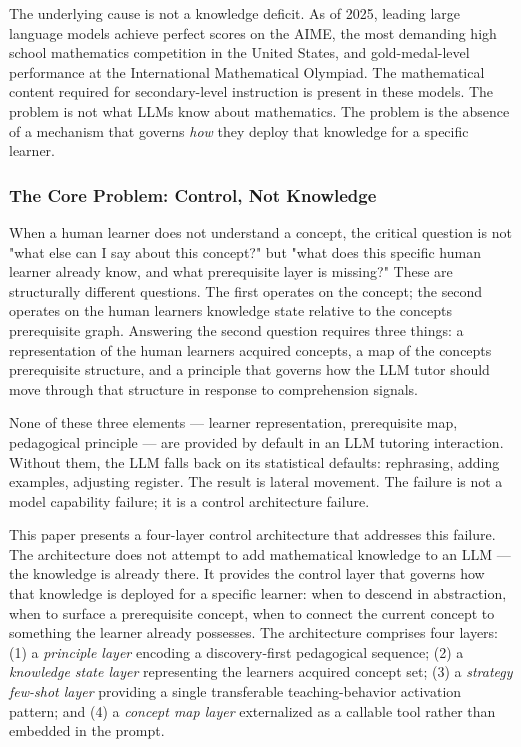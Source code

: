 \documentclass[
]{article}
\begin{document}
The underlying cause is not a knowledge deficit. As of 2025, leading large language models achieve perfect scores on the AIME, the most demanding high school mathematics competition in the United States, and gold-medal-level performance at the International Mathematical Olympiad. The mathematical content required for secondary-level instruction is present in these models. The problem is not what LLMs know about mathematics. The problem is the absence of a mechanism that governs \emph{how} they deploy that knowledge for a specific learner.

\subsubsection{The Core Problem: Control, Not Knowledge}\label{the-core-problem-control-not-knowledge}

When a human learner does not understand a concept, the critical question is not "what else can I say about this concept?" but "what does this specific human learner already know, and what prerequisite layer is missing?" These are structurally different questions. The first operates on the concept; the second operates on the human learner\textquotesingle s knowledge state relative to the concept\textquotesingle s prerequisite graph. Answering the second question requires three things: a representation of the human learner\textquotesingle s acquired concepts, a map of the concept\textquotesingle s prerequisite structure, and a principle that governs how the LLM tutor should move through that structure in response to comprehension signals.

None of these three elements --- learner representation, prerequisite map, pedagogical principle --- are provided by default in an LLM tutoring interaction. Without them, the LLM falls back on its statistical defaults: rephrasing, adding examples, adjusting register. The result is lateral movement. The failure is not a model capability failure; it is a control architecture failure.

This paper presents a four-layer control architecture that addresses this failure. The architecture does not attempt to add mathematical knowledge to an LLM --- the knowledge is already there. It provides the control layer that governs how that knowledge is deployed for a specific learner: when to descend in abstraction, when to surface a prerequisite concept, when to connect the current concept to something the learner already possesses. The architecture comprises four layers: (1) a \emph{principle layer} encoding a discovery-first pedagogical sequence; (2) a \emph{knowledge state layer} representing the learner\textquotesingle s acquired concept set; (3) a \emph{strategy few-shot layer} providing a single transferable teaching-behavior activation pattern; and (4) a \emph{concept map layer} externalized as a callable tool rather than embedded in the prompt.
\end{document}
